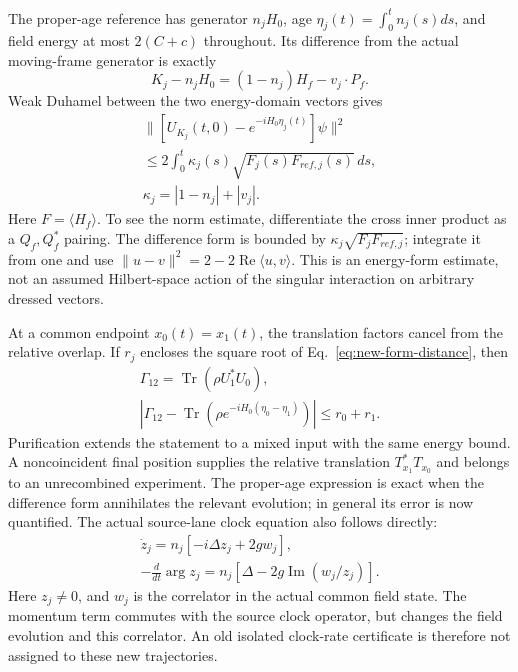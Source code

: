 The proper-age reference has generator \(n_jH_0\), age
\(\eta_j(t)=\int_0^t n_j(s)ds\), and field energy at most
\(2(C+c)\) throughout. Its difference from the actual moving-frame
generator is exactly
\[
 K_j-n_jH_0=(1-n_j)H_f-v_j\cdot P_f.
\]
Weak Duhamel between the two energy-domain vectors gives
\begin{equation}
\begin{gathered}
 \|[U_{K_j}(t,0)-e^{-iH_0\eta_j(t)}]\psi\|^2\\
 \leq2\int_0^t \kappa_j(s)\sqrt{F_j(s)F_{ref,j}(s)}\,ds,\\
 \kappa_j=|1-n_j|+|v_j|.
\end{gathered}
\label{eq:new-form-distance}
\end{equation}
Here \(F=\langle H_f\rangle\). To see the norm estimate, differentiate
the cross inner product as a \(Q_f,Q_f^*\) pairing. The difference form
is bounded by \(\kappa_j\sqrt{F_jF_{ref,j}}\); integrate it from one
and use \(\|u-v\|^2=2-2\operatorname{Re}\langle u,v\rangle\).
This is an energy-form estimate, not an assumed Hilbert-space action of
the singular interaction on arbitrary dressed vectors.

At a common endpoint \(x_0(t)=x_1(t)\), the translation factors cancel
from the relative overlap. If \(r_j\) encloses the square root of
Eq.~\eqref{eq:new-form-distance}, then
\begin{equation}
\begin{gathered}
\Gamma_{12}=\operatorname{Tr}(\rho U_1^*U_0),\\
 |\Gamma_{12}-\operatorname{Tr}(\rho e^{-iH_0(\eta_0-\eta_1)})|
 \leq r_0+r_1 .
\end{gathered}
\label{eq:new-actual-overlap}
\end{equation}
Purification extends the statement to a mixed input with the same energy
bound. A noncoincident final position supplies the relative translation
\(T_{x_1}^*T_{x_0}\) and belongs to an unrecombined experiment.
The proper-age expression is exact when the difference form annihilates
the relevant evolution; in general its error is now quantified.
The actual source-lane clock equation also follows directly:
\[\begin{gathered}
\dot z_j=n_j[-i\Delta z_j+2g w_j],\\
 -\frac d{dt}\arg z_j=n_j[\Delta-2g\operatorname{Im}(w_j/z_j)].
\end{gathered}\]
Here \(z_j\ne0\), and \(w_j\) is the correlator in the actual common
field state. The momentum term commutes with the source clock operator,
but changes the field evolution and this correlator. An old isolated
clock-rate certificate is therefore not assigned to these new trajectories.

